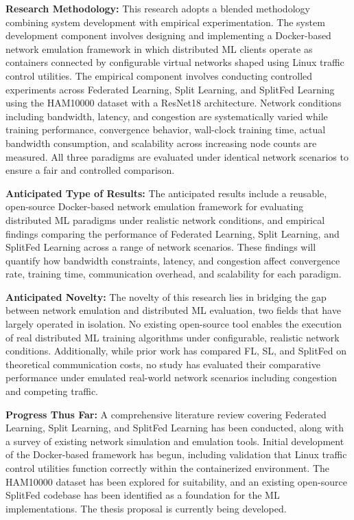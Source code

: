 \documentclass[12pt]{article}
\begin{document}
\textbf{Research Methodology:} This research adopts a blended methodology combining system development with empirical experimentation. The system development component involves designing and implementing a Docker-based network emulation framework in which distributed ML clients operate as containers connected by configurable virtual networks shaped using Linux traffic control utilities. The empirical component involves conducting controlled experiments across Federated Learning, Split Learning, and SplitFed Learning using the HAM10000 dataset with a ResNet18 architecture. Network conditions including bandwidth, latency, and congestion are systematically varied while training performance, convergence behavior, wall-clock training time, actual bandwidth consumption, and scalability across increasing node counts are measured. All three paradigms are evaluated under identical network scenarios to ensure a fair and controlled comparison.

\textbf{Anticipated Type of Results:} The anticipated results include a reusable, open-source Docker-based network emulation framework for evaluating distributed ML paradigms under realistic network conditions, and empirical findings comparing the performance of Federated Learning, Split Learning, and SplitFed Learning across a range of network scenarios. These findings will quantify how bandwidth constraints, latency, and congestion affect convergence rate, training time, communication overhead, and scalability for each paradigm.

\textbf{Anticipated Novelty:} The novelty of this research lies in bridging the gap between network emulation and distributed ML evaluation, two fields that have largely operated in isolation. No existing open-source tool enables the execution of real distributed ML training algorithms under configurable, realistic network conditions. Additionally, while prior work has compared FL, SL, and SplitFed on theoretical communication costs, no study has evaluated their comparative performance under emulated real-world network scenarios including congestion and competing traffic.

\textbf{Progress Thus Far:} A comprehensive literature review covering Federated Learning, Split Learning, and SplitFed Learning has been conducted, along with a survey of existing network simulation and emulation tools. Initial development of the Docker-based framework has begun, including validation that Linux traffic control utilities function correctly within the containerized environment. The HAM10000 dataset has been explored for suitability, and an existing open-source SplitFed codebase has been identified as a foundation for the ML implementations. The thesis proposal is currently being developed.
\end{document}
